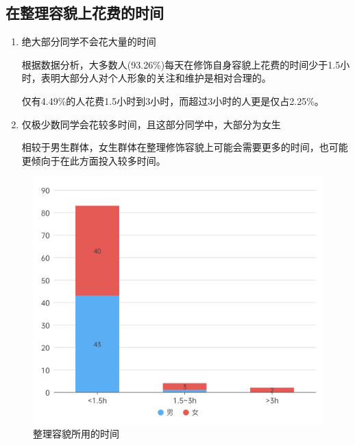 \subsection{在整理容貌上花费的时间}
\begin{enumerate}[leftmargin=7em]
    \item 绝大部分同学不会花大量的时间

    根据数据分析，大多数人(93.26\%)每天在修饰自身容貌上花费的时间少于1.5小时，表明大部分人对个人形象的关注和维护是相对合理的。

    仅有4.49\%的人花费1.5小时到3小时，而超过3小时的人更是仅占2.25\%。

    \item 仅极少数同学会花较多时间，且这部分同学中，大部分为女生

    相较于男生群体，女生群体在整理修饰容貌上可能会需要更多的时间，也可能更倾向于在此方面投入较多时间。

\end{enumerate}
\begin{figure}[H]
    \centering
    \includegraphics[width=.5\textwidth]{./pic/整理容貌所用的时间.png}
    \caption{整理容貌所用的时间}
    \label{pic:times}
\end{figure}
